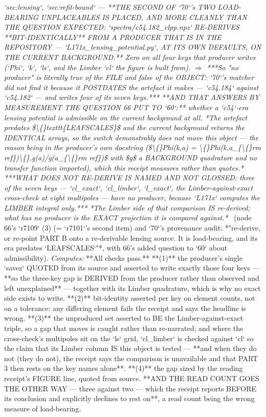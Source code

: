 \begin{description}
\textit{`sec:lensing`, `sec:refit-bound` ---  **THE SECOND OF `70`'s TWO LOAD-BEARING UNPLACEABLES IS PLACED, AND MORE CLEANLY THAN THE QUESTION EXPECTED: `spectra/c54.182\_clpp.npz` RE-DERIVES **BIT-IDENTICALLY** FROM A PRODUCER THAT IS IN THE REPOSITORY --- `L171x\_lensing\_potential.py`, AT ITS OWN DEFAULTS, ON THE CURRENT BACKGROUND.** Zero on all four keys that producer writes (`Phi`, `k`, `ls`, and the Limber `cl` the figure is built from). \ensuremath{\Rightarrow} ***So "no producer" is literally true of the FILE and false of the OBJECT: `70`'s matcher did not find it because it POSTDATES the artefact it makes --- `c54.184` against `c54.182` --- and writes four of its seven keys.***  **AND THAT ANSWERS BY MEASUREMENT THE QUESTION 66 PUT TO `60`:** whether a `c54`-era lensing potential is admissible on the current background at all. *The artefact predates \$\textbackslash\{\}texttt\{LEAFSCALES\}\$ and the current background returns the IDENTICAL arrays, so the switch demonstrably does not move this object --- the reason being in the producer's own docstring (\$\textbackslash\{\}Phi(k,a) = \textbackslash\{\}Phi(k,a\_\{\textbackslash\{\}rm ref\})\textbackslash\{\},g(a)/g(a\_\{\textbackslash\{\}rm ref\})\$ with \$g\$ a BACKGROUND quadrature and no transfer function imported), which this receipt measures rather than quotes.*  ***WHAT DOES NOT RE-DERIVE IS NAMED AND NOT GLOSSED: three of the seven keys --- `cl\_exact`, `cl\_limber`, `l\_exact`, the Limber-against-exact cross-check at eight multipoles --- have no producer, because `L171x` computes the LIMBER integral only.*** *The Limber side of that comparison IS re-derived; what has no producer is the EXACT projection it is compared against.*} \ (node 66's `r7109` (3) (= `r7101`'s second item) and `70`'s provenance audit: *"re-derive, or re-point PART B onto a re-derivable lensing source. It is load-bearing, and its era predates `LEAFSCALES`"*, with 66's added question to `60` about admissibility). 
\emph{Computes:} **All checks pass.** **(1)** the producer's single `savez` QUOTED from its source and asserted to write exactly those four keys --- **so the three-key gap is DERIVED from the producer rather than observed and left unexplained** --- together with its Limber quadrature, which is why no exact side exists to write. **(2)** bit-identity asserted per key on element counts, not on a tolerance: any differing element fails the receipt and says the headline is wrong. **(3)** the unproduced set asserted to BE the Limber-against-exact triple, so a gap that moves is caught rather than re-narrated; and where the cross-check's multipoles sit on the `ls` grid, `cl\_limber` is checked against `cl` so the claim that its Limber column IS this object is tested --- **and when they do not (they do not), the receipt says the comparison is unavailable and that PART 3 then rests on the key names alone**. **(4)** the gap sized by the reading receipt's FIGURE line, quoted from source.  **AND THE READ COUNT GOES THE OTHER WAY --- three against two --- which the receipt reports BEFORE its conclusion and explicitly declines to rest on**, a read count being the wrong measure of load-bearing.

\end{description}
